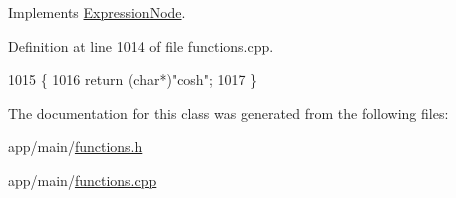 Implements \hyperlink{classExpressionNode_a42a5e9562b0f645a19dcc83f698069b5}{Expression\+Node}.



Definition at line 1014 of file functions.\+cpp.


\begin{DoxyCode}
1015 \{
1016     \textcolor{keywordflow}{return} (\textcolor{keywordtype}{char}*)\textcolor{stringliteral}{"cosh"};
1017 \}
\end{DoxyCode}


The documentation for this class was generated from the following files\+:\begin{DoxyCompactItemize}
\item 
app/main/\hyperlink{functions_8h}{functions.\+h}\item 
app/main/\hyperlink{functions_8cpp}{functions.\+cpp}\end{DoxyCompactItemize}
